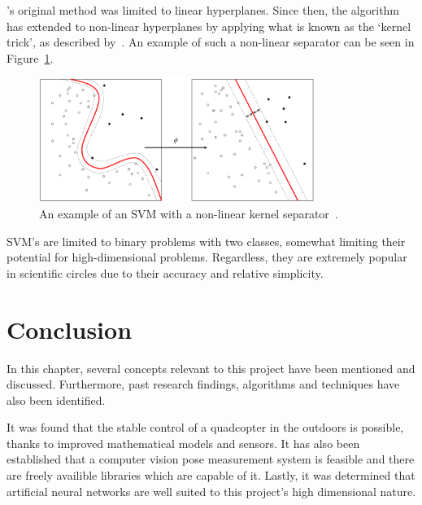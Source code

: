 \citeauthor{vapnik1995support}'s original method was limited to linear hyperplanes. Since then, the algorithm has extended to non-linear hyperplanes by applying what is known as the `kernel trick', as described by~\cite{amari1999improving}. An example of such a non-linear separator can be seen in Figure~\ref{fig:chap2-svm-nonlinear}.

\begin{figure}
  \centering
  \includegraphics[width=0.8\textwidth]{figures/chapter2/svm_nonlinear}
  \caption[Example of an SVM with a non-linear kernel separator.]{An example of an SVM with a non-linear kernel separator~\citep{kernel-wiki-pic}.}
\label{fig:chap2-svm-nonlinear}
\end{figure}

SVM's are limited to  binary problems with two classes, somewhat limiting their potential for high-dimensional problems. Regardless, they are extremely popular in scientific circles due to their accuracy and relative simplicity. 

\section{Conclusion}

In this chapter, several concepts relevant to this project have been mentioned and discussed. Furthermore, past research findings, algorithms and techniques have also been identified. 

It was found that the stable control of a quadcopter in the outdoors is possible, thanks to improved mathematical models and sensors. It has also been established that a computer vision pose measurement system is feasible and there are freely availible libraries which are capable of it. Lastly, it was determined that artificial neural networks are well suited to this project's high dimensional nature. 
